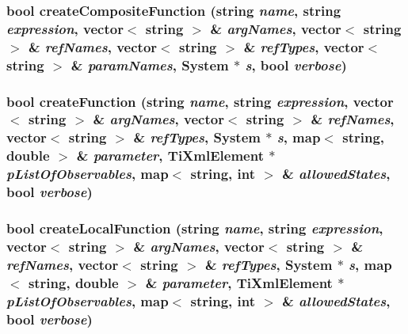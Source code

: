 \subsubsection{\setlength{\rightskip}{0pt plus 5cm}bool createCompositeFunction (string {\em name}, string {\em expression}, vector$<$ string $>$ \& {\em argNames}, vector$<$ string $>$ \& {\em refNames}, vector$<$ string $>$ \& {\em refTypes}, vector$<$ string $>$ \& {\em paramNames}, {\bf System} $\ast$ {\em s}, bool {\em verbose})}\label{parseFuncXML_8cpp_3f8247ddc5977a45875853ff373c750b}


\subsubsection{\setlength{\rightskip}{0pt plus 5cm}bool createFunction (string {\em name}, string {\em expression}, vector$<$ string $>$ \& {\em argNames}, vector$<$ string $>$ \& {\em refNames}, vector$<$ string $>$ \& {\em refTypes}, {\bf System} $\ast$ {\em s}, map$<$ string, double $>$ \& {\em parameter}, {\bf TiXmlElement} $\ast$ {\em pListOfObservables}, map$<$ string, int $>$ \& {\em allowedStates}, bool {\em verbose})}\label{parseFuncXML_8cpp_e4c45503e3ee280c3a9ff8935d66778d}


\subsubsection{\setlength{\rightskip}{0pt plus 5cm}bool createLocalFunction (string {\em name}, string {\em expression}, vector$<$ string $>$ \& {\em argNames}, vector$<$ string $>$ \& {\em refNames}, vector$<$ string $>$ \& {\em refTypes}, {\bf System} $\ast$ {\em s}, map$<$ string, double $>$ \& {\em parameter}, {\bf TiXmlElement} $\ast$ {\em pListOfObservables}, map$<$ string, int $>$ \& {\em allowedStates}, bool {\em verbose})}\label{parseFuncXML_8cpp_b405df26a0d1883cb1964ca8f5f3cade}


